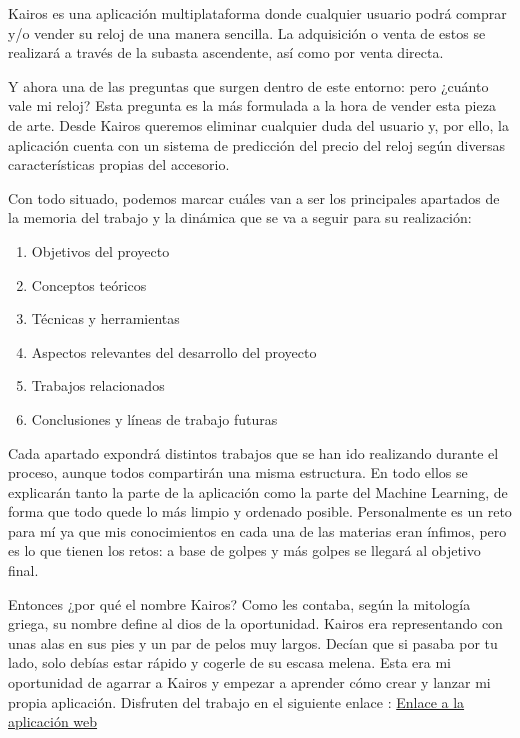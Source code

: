 Kairos es una aplicación multiplataforma donde cualquier usuario podrá comprar y/o vender su reloj de una manera sencilla. La adquisición o venta de estos se realizará a través de la subasta ascendente, así como por venta directa.

Y ahora una de las preguntas que surgen dentro de este entorno: pero ¿cuánto vale mi reloj? Esta pregunta es la más formulada a la hora de vender esta pieza de arte. Desde Kairos queremos eliminar cualquier duda del usuario y, por ello, la aplicación cuenta con un sistema de predicción del precio del reloj según diversas características propias del accesorio.

Con todo situado, podemos marcar cuáles van a ser los principales apartados de la memoria del trabajo y la dinámica que se va a seguir para su realización:

\begin{enumerate}
	\item Objetivos del proyecto
	\item Conceptos teóricos
	\item Técnicas y herramientas
	\item Aspectos relevantes del desarrollo del proyecto
	\item Trabajos relacionados
	\item Conclusiones y líneas de trabajo futuras
\end{enumerate}

Cada apartado expondrá distintos trabajos que se han ido realizando durante el proceso, aunque todos compartirán una misma estructura. En todo ellos se explicarán tanto la parte de la aplicación como la parte del Machine Learning, de forma que todo quede lo más limpio y ordenado posible. Personalmente es un reto para mí ya que mis conocimientos en cada una de las materias eran ínfimos, pero es lo que tienen los retos: a base de golpes y más golpes se llegará al objetivo final.

Entonces ¿por qué el nombre Kairos? Como les contaba, según la mitología griega, su nombre define al dios de la oportunidad. Kairos era representando con unas alas en sus pies y un par de pelos muy largos. Decían que si pasaba por tu lado, solo debías estar rápido y cogerle de su escasa melena. Esta era mi oportunidad de agarrar a Kairos y empezar a aprender cómo crear y lanzar mi propia aplicación. Disfruten del trabajo en el siguiente enlace : \href{https://kairosrpu.netlify.app/}{Enlace a la aplicación web}

